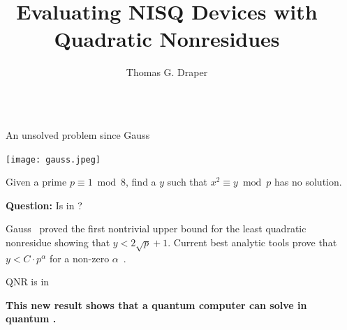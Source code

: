 \documentclass[final]{beamer}
\title{Evaluating NISQ Devices with Quadratic Nonresidues}
\author{Thomas G. Draper}
\institute[shortinst]{Center for Communications Research at La Jolla}
\providecommand{\QNR}{\csword{QNR}}
\newlength{\sepwidth}
\newlength{\colwidth}
\newcommand{\separatorcolumn}{\begin{column}{\sepwidth}\end{column}}
\begin{document}
\begin{frame}[t]

\begin{columns}[t]
\separatorcolumn

\begin{column}{\colwidth}

  \begin{block}{An unsolved problem since Gauss}
  \begin{minipage}[c]{0.3\colwidth}
    \texttt{[image: gauss.jpeg]}
  \end{minipage}
  \begin{minipage}[l]{0.7\colwidth}
    \bigskip

    Given a prime $p\equiv 1\bmod 8$, find a $y$ such that $x^2\equiv y \bmod p$ has no solution.  

    \bigskip
  {\bf Question:} Is \QNR in \xP?
    \bigskip
  \end{minipage}

Gauss~\cite{gauss} proved the first nontrivial upper bound for the least quadratic nonresidue showing that $y<2\sqrt{p}+1$.
Current best analytic tools prove that $y < C\cdot p^\alpha$ for a non-zero $\alpha$~\cite[p. 33]{1993--cohen}.
  \end{block}

  \begin{exampleblock}{QNR is in \EQPC}

    {\bf This new result shows that a quantum computer can solve \QNR in quantum \xP.}


\end{exampleblock}
\end{column}
\end{columns}
\end{frame}
\end{document}
